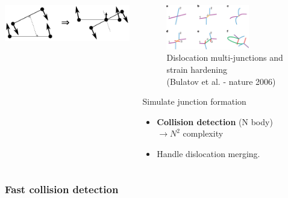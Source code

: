 \documentclass[aspectratio=1610,t,10pt]{beamer}
\newlength{\freeheight}
\begin{document}
\begin{frame}
\begin{columns}[c]
\begin{column}{.48\textwidth}
		\includegraphics[height=0.25\freeheight]{img/collision_topo_segseg}
	\end{column}
	\begin{column}{.48\textwidth}
		\begin{figure}
			\centering
			\caption*{Dislocation multi-junctions and strain hardening \\ (Bulatov et al. - nature 2006)}
			\includegraphics[width=0.7\textwidth]{img/junction_nature}
		\end{figure}
		\begin{block}{Simulate junction formation}
			\begin{itemize}
				\item \textbf{Collision detection} (N body) \\ {\footnotesize$\rightarrow N^2$ complexity}
				\item Handle dislocation merging.
			\end{itemize}
		\end{block}		
	\end{column}
\end{columns}
\end{frame}

\subsubsection{Fast collision detection}
\end{document}
